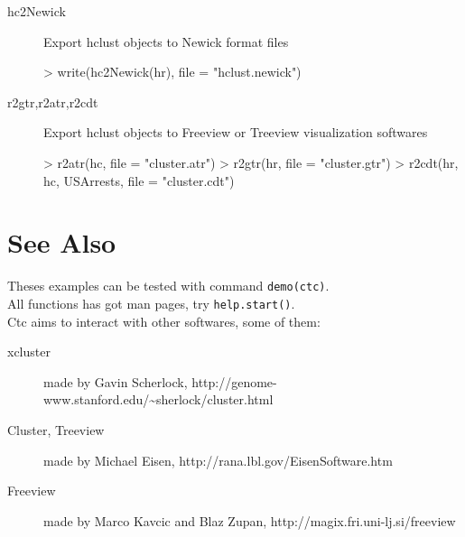 \documentclass[a4paper]{article}
\begin{document}
\begin{description}
\item[hc2Newick] Export hclust objects to Newick format files
\begin{Schunk}
\begin{Sinput}
> write(hc2Newick(hr), file = "hclust.newick")
\end{Sinput}
\end{Schunk}
\item[r2gtr,r2atr,r2cdt] Export hclust objects to Freeview or Treeview
visualization softwares
\begin{Schunk}
\begin{Sinput}
> r2atr(hc, file = "cluster.atr")
> r2gtr(hr, file = "cluster.gtr")
> r2cdt(hr, hc, USArrests, file = "cluster.cdt")
\end{Sinput}
\end{Schunk}
\end{description}
    
\section{See Also}

Theses examples can be tested with command
{\tt demo(ctc)}.\\


\noindent
All functions has got man pages, try 
{\tt help.start()}.\\

\noindent
Ctc aims to interact with other softwares, some of them:
\begin{description}
\item[xcluster]
made  by Gavin Scherlock, http://genome-www.stanford.edu/\~\/sherlock/cluster.html
\item[Cluster, Treeview]
made  by Michael Eisen, http://rana.lbl.gov/EisenSoftware.htm
\item[Freeview]
made by Marco Kavcic and Blaz Zupan,
http://magix.fri.uni-lj.si/freeview
\end{description}                 
\end{document}
